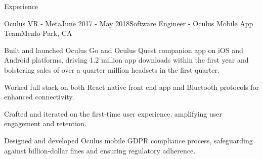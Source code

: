 \documentclass{resume} %
\begin{document}
\begin{rSection}{Experience}

  \begin{rSubsection}{Oculus VR - Meta}{June 2017 - May 2018}{Software Engineer - Oculus Mobile App Team}{Menlo Park, CA}
    \item Built and launched Oculus Go and Oculus Quest companion app on iOS and Android platforms, 
      driving 1.2 million app downloads within the first year and bolstering sales of over a quarter million headsets in the first quarter.
    \item Worked full stack on both React native front end app and Bluetooth protocols for enhanced connectivity.
    \item Crafted and iterated on the first-time user experience, amplifying user engagement and retention.
    \item Designed and developed Oculus mobile GDPR compliance process, safeguarding against billion-dollar fines and ensuring regulatory adherence.
  \end{rSubsection}







\end{rSection}
\end{document}

